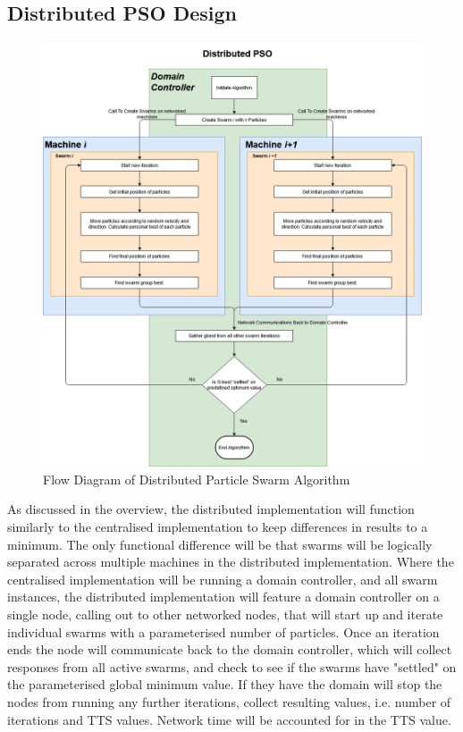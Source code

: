 \documentclass[oneside,12pt]{book}
\begin{document}
\subsection{Distributed PSO Design}
\begin{figure}[H]
    \centering
    \includegraphics[scale=0.4]{Images/FlowDiagramDistibutedPSO.png}
    \caption{Flow Diagram of Distributed Particle Swarm Algorithm}
    \label{fig:Flow Diagram of Distributed Particle Swarm Algorithm}
\end{figure}
As discussed in the overview, the distributed implementation will function similarly to the centralised implementation to keep differences in results to a minimum. The only functional difference will be that swarms will be logically separated across multiple machines in the distributed implementation. Where the centralised implementation will be running a domain controller, and all swarm instances, the distributed implementation will feature a domain controller on a single node, calling out to other networked nodes, that will start up and iterate individual swarms with a parameterised number of particles. Once an iteration ends the node will communicate back to the domain controller, which will collect responses from all active swarms, and check to see if the swarms have "settled" on the parameterised global minimum value. 
If they have the domain will stop the nodes from running any further iterations, collect resulting values, i.e. number of iterations and TTS values. Network time will be accounted for in the TTS value.
\end{document}
